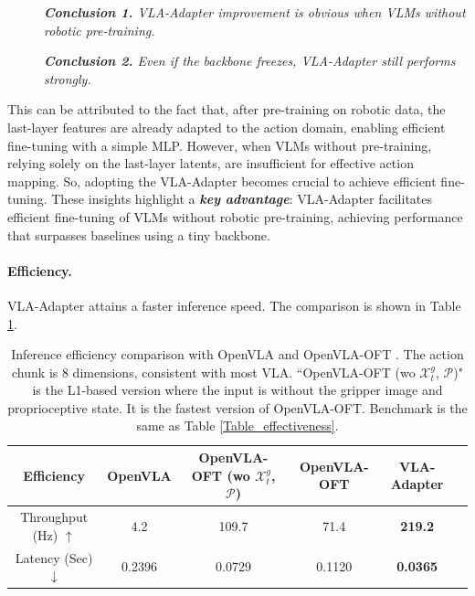 \begin{description}
	\item[] \thinspace \textit{\textbf{Conclusion 1.} VLA-Adapter improvement is obvious when VLMs without robotic pre-training.}
	\item[] \thinspace \textit{\textbf{Conclusion 2.} Even if the backbone freezes, VLA-Adapter still performs strongly.}
\end{description}

This can be attributed to the fact that, after pre-training on robotic data, the last-layer features are already adapted to the action domain, enabling efficient fine-tuning with a simple MLP. However, when VLMs without pre-training, relying solely on the last-layer latents, are insufficient for effective action mapping. So, adopting the VLA-Adapter becomes crucial to achieve efficient fine-tuning. These insights highlight a \textbf{\textit{key advantage}}: VLA-Adapter facilitates efficient fine-tuning of VLMs without robotic pre-training, achieving performance that surpasses baselines using a tiny backbone.

\paragraph{Efficiency.} VLA-Adapter attains a faster inference speed. The comparison is shown in Table \ref{Table_inference}.

\begin{table}[!htbp]
    \centering
    \small
    \setlength{\tabcolsep}{2mm}
    \caption{Inference efficiency comparison with OpenVLA \citep{OpenVLA-2024} and OpenVLA-OFT \citep{OpenVLA-OFT-2025}. The action chunk is 8 dimensions, consistent with most VLA. ``OpenVLA-OFT (wo $\mathcal{X}_t^g$, $\mathcal{P}$)" is the L1-based version where the input is without the gripper image and proprioceptive state. It is the fastest version of OpenVLA-OFT. Benchmark is the same as Table \ref{Table_effectiveness}.}\label{Table_inference}
	\begin{tabular}{c|ccccc}
		\toprule[1pt]
		Efficiency &OpenVLA&OpenVLA-OFT (wo $\mathcal{X}_t^g$, $\mathcal{P}$) & OpenVLA-OFT&\textbf{VLA-Adapter}\\
		\midrule[0.5pt]
		Throughput (Hz) $\uparrow$&4.2& 109.7 &71.4&\textbf{219.2} \\
		Latency (Sec) $\downarrow$&0.2396&0.0729&0.1120&\textbf{0.0365} \\
		\bottomrule[1pt]
	\end{tabular}%
\end{table}%


